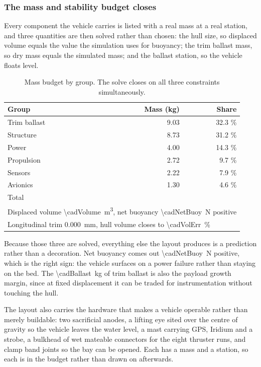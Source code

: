 \documentclass[10pt,a4paper]{article}
\begin{document}
\subsubsection{The mass and stability budget closes}

Every component the vehicle carries is listed with a real mass at a real
station, and three quantities are then solved rather than chosen: the hull
size, so displaced volume equals the value the simulation uses for buoyancy;
the trim ballast mass, so dry mass equals the simulated mass; and the ballast
station, so the vehicle floats level.

\begin{table}[htbp]\centering\small
\caption{Mass budget by group. The solve closes on all three constraints
simultaneously.}\label{tab:mass}
\begin{tabular}{lrr}
\toprule
\textbf{Group} & \textbf{Mass (kg)} & \textbf{Share} \\
\midrule
Trim ballast & 9.03 & 32.3 \% \\
Structure & 8.73 & 31.2 \% \\
Power & 4.00 & 14.3 \% \\
Propulsion & 2.72 & 9.7 \% \\
Sensors & 2.22 & 7.9 \% \\
Avionics & 1.30 & 4.6 \% \\
\midrule
Total & \cadMass{} & \\
\midrule
\multicolumn{3}{l}{Displaced volume \SI{\cadVolume}{\cubic\metre},
net buoyancy \SI{\cadNetBuoy}{\newton} positive} \\
\multicolumn{3}{l}{Longitudinal trim \SI{0.000}{\milli\metre},
hull volume closes to \SI{\cadVolErr}{\percent}} \\
\bottomrule
\end{tabular}
\end{table}

Because those three are solved, everything else the layout produces is a
prediction rather than a decoration. Net buoyancy comes out
\SI{\cadNetBuoy}{\newton} positive, which is the right sign: the vehicle
surfaces on a power failure rather than staying on the bed. The
\SI{\cadBallast}{\kilo\gram} of trim ballast is also the payload growth margin,
since at fixed displacement it can be traded for instrumentation without
touching the hull.

The layout also carries the hardware that makes a vehicle operable rather than
merely buildable: two sacrificial anodes, a lifting eye sited over the centre of
gravity so the vehicle leaves the water level, a mast carrying GPS, Iridium and
a strobe, a bulkhead of wet mateable connectors for the eight thruster runs, and
clamp band joints so the bay can be opened. Each has a mass and a station, so
each is in the budget rather than drawn on afterwards.
\end{document}
